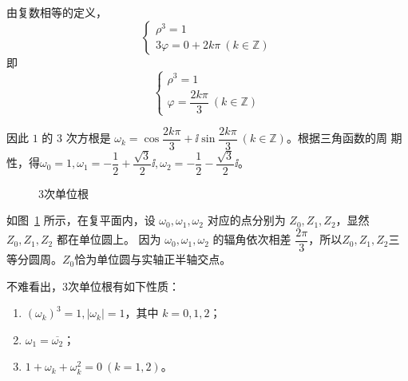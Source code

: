 \documentclass[a4paper,openany]{ctexbook}
\begin{document}
由复数相等的定义，
\[
    \begin{cases}
        \rho ^3=1 \\
        3 \varphi =0+2k \pi \ (k \in \mathbb{Z} )
    \end{cases}
\]
即
\[
    \begin{cases}
        \rho ^3=1 \\
        \varphi=\dfrac{2k \pi }{3} \ (k \in \mathbb{Z} )
    \end{cases}
\]

因此 \(1\) 的 \(3\) 次方根是 \(\omega_k=\cos \dfrac{2k \pi }{3}+\ii \sin \dfrac{2k \pi }{3}\ (k \in \mathbb{Z} )\)。根据三角函数的周
期性，得\(\omega_0=1,\omega_1=-\dfrac{1}{2}+\dfrac{\sqrt{3}}{2}\ii,\omega_2=-\dfrac{1}{2}-\dfrac{\sqrt{3}}{2}\ii\)。

\begin{figure}
    \centering
    \caption{\(3\)次单位根}\label{fgr:3cidjwwgf}
\end{figure}

如图~\ref{fgr:3cidjwwgf} 所示，在复平面内，设 \(\omega_0,\omega_1,\omega_2\) 对应的点分别为 \(Z_0,Z_1,Z_2\)，显然 \(Z_0,Z_1,Z_2\) 都在单位圆上。
因为 \(\omega_0,\omega_1,\omega_2\) 的辐角依次相差 \(\dfrac{2 \pi }{3}\)，所以\(Z_0,Z_1,Z_2\)三等分圆周。\(Z_0\)恰为单位圆与实轴正半轴交点。

不难看出，\(3\)次单位根有如下性质：

\begin{enumerate}
    \item \((\omega_k)^3=1,|\omega_k|=1\)，其中 \(k=0,1,2\)；
    \item \(\omega_1=\overline{\omega_2}\)；
    \item \(1+\omega_k+\omega_k^2=0 \ (k=1,2)\)。
\end{enumerate}
\end{document}
